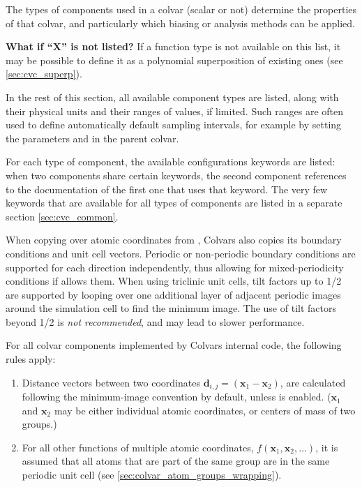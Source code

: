 The types of components used in a colvar (scalar or not) determine the
properties of that colvar, and particularly which biasing or analysis methods
can be applied.

\textbf{What if ``X'' is not listed?} If a function type is not available on this list, it may be possible to define it as a polynomial superposition of existing ones (see \ref{sec:cvc_superp}).

In the rest of this section, all available component types are listed, along with their physical units and their ranges of values, if limited.
Such ranges are often used to define automatically default sampling intervals, for example by setting the parameters  and  in the parent colvar.

For each type of component, the available configurations keywords are listed:
when two components share certain keywords, the second component references to
the documentation of the first one that uses that keyword.
The very few keywords that are available for all types of components are listed in a separate section \ref{sec:cvc_common}.



When copying over atomic coordinates from \MDENGINE, Colvars also copies its boundary conditions and unit cell vectors.  Periodic or non-periodic boundary conditions are supported for each direction independently, thus allowing for mixed-periodicity conditions if \MDENGINE{} allows them.  When using triclinic unit cells, tilt factors up to 1/2 are supported by looping over one additional layer of adjacent periodic images around the simulation cell to find the minimum image.  The use of tilt factors beyond 1/2 is \emph{not recommended}, and may lead to slower performance.

For all colvar components implemented by Colvars internal code, the following rules apply:
\begin{enumerate}
\item Distance vectors between two coordinates
  $\mathbf{d}_{i,j} = \left(\mathbf{x}_1 - \mathbf{x}_2\right)$, are calculated following the
  minimum-image convention by default, unless  is enabled.
  ($\mathbf{x}_1$ and $\mathbf{x}_2$ may be either individual atomic coordinates, or centers of mass
  of two groups.)
\item For all other functions of multiple atomic coordinates,
  $f\left(\mathbf{x}_1, \mathbf{x}_2, \ldots\right)$, it is assumed that all atoms that are part of
  the same group are in the same periodic unit cell (see \ref{sec:colvar_atom_groups_wrapping}).
\end{enumerate}

